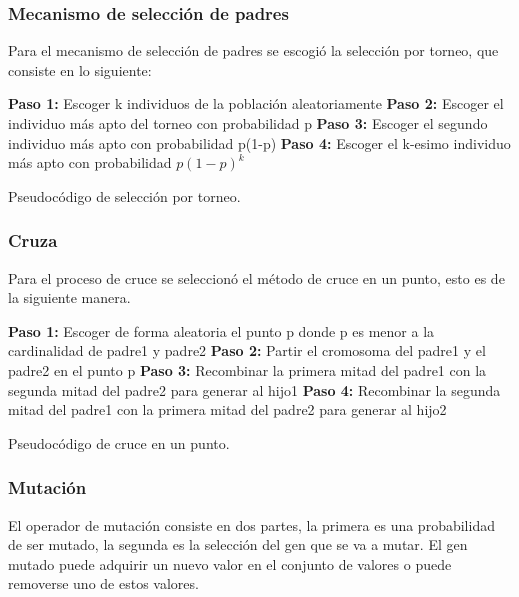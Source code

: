 \subsubsection{Mecanismo de selección de padres}

Para el mecanismo de selección de padres se escogió la selección por torneo, que consiste en lo siguiente:

\begin{algorithm}[H] 
	\SetAlgoLined
	\textbf{Paso 1:} Escoger k individuos de la población aleatoriamente\;
	\textbf{Paso 2:} Escoger el individuo más apto del torneo con probabilidad p\;
	\textbf{Paso 3:} Escoger el segundo individuo más apto con probabilidad p(1-p) \;
	\textbf{Paso 4:} Escoger el k-esimo individuo más apto con probabilidad $p(1-p)^k$ \;
	\caption{Pseudocódigo de selección por torneo.}
\end{algorithm}

\subsubsection{Cruza}

Para el proceso de cruce se seleccionó el método de cruce en un punto, esto es de la siguiente manera.
\\
\begin{algorithm}[H] 
	\SetAlgoLined
	\textbf{Paso 1:} Escoger de forma aleatoria el punto p donde p es menor a la cardinalidad de padre1 y padre2\;
	\textbf{Paso 2:} Partir el cromosoma del padre1 y el padre2 en el punto p\;
	\textbf{Paso 3:} Recombinar la primera mitad del padre1 con la segunda mitad del padre2 para generar al hijo1\;
	\textbf{Paso 4:} Recombinar la segunda mitad del padre1 con la primera mitad del padre2 para generar al hijo2\;
	\caption{Pseudocódigo de cruce en un punto.}
\end{algorithm}

\subsubsection{Mutación}

El operador de mutación consiste en dos partes, la primera es una probabilidad de ser mutado, la segunda es la selección del gen que se va a mutar. El gen mutado puede adquirir un nuevo valor en el conjunto de valores o puede removerse uno de estos valores.

